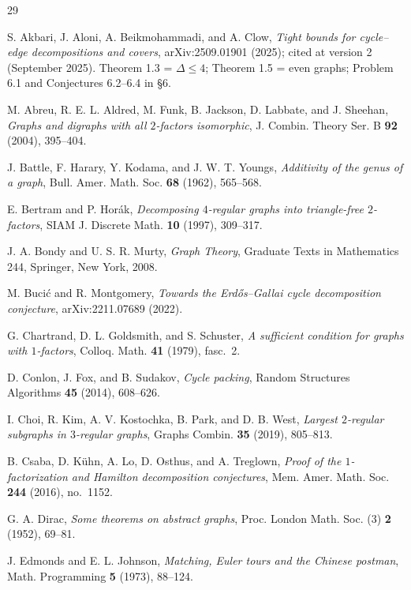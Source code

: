 \documentclass[a4paper,11pt]{amsart}
\theoremstyle{definition}
\theoremstyle{remark}
\begin{document}
\begin{thebibliography}{29}

 S. Akbari, J. Aloni, A. Beikmohammadi, and A. Clow, \emph{Tight bounds for cycle--edge
decompositions and covers}, arXiv:2509.01901 (2025); cited at version 2 (September 2025). Theorem 1.3 =
$\Delta\le4$; Theorem 1.5 = even graphs; Problem 6.1 and Conjectures 6.2--6.4 in \S6.

 M. Abreu, R. E. L. Aldred, M. Funk, B. Jackson, D. Labbate, and J. Sheehan,
\emph{Graphs and digraphs with all $2$-factors isomorphic}, J. Combin. Theory Ser. B \textbf{92} (2004),
395--404.

 J. Battle, F. Harary, Y. Kodama, and J. W. T. Youngs, \emph{Additivity of the genus of a
graph}, Bull. Amer. Math. Soc. \textbf{68} (1962), 565--568.

 E. Bertram and P. Hor\'ak, \emph{Decomposing $4$-regular graphs into triangle-free
$2$-factors}, SIAM J. Discrete Math. \textbf{10} (1997), 309--317.

 J. A. Bondy and U. S. R. Murty, \emph{Graph Theory}, Graduate Texts in Mathematics 244,
Springer, New York, 2008.

 M. Buci\'c and R. Montgomery, \emph{Towards the Erd\H{o}s--Gallai cycle decomposition
conjecture}, arXiv:2211.07689 (2022).

 G. Chartrand, D. L. Goldsmith, and S. Schuster, \emph{A sufficient condition for graphs
with $1$-factors}, Colloq. Math. \textbf{41} (1979), fasc.\ 2.

 D. Conlon, J. Fox, and B. Sudakov, \emph{Cycle packing}, Random Structures Algorithms
\textbf{45} (2014), 608--626.

 I. Choi, R. Kim, A. V. Kostochka, B. Park, and D. B. West, \emph{Largest $2$-regular
subgraphs in $3$-regular graphs}, Graphs Combin. \textbf{35} (2019), 805--813.

 B. Csaba, D. K\"uhn, A. Lo, D. Osthus, and A. Treglown, \emph{Proof of the
$1$-factorization and Hamilton decomposition conjectures}, Mem. Amer. Math. Soc. \textbf{244} (2016),
no.\ 1152.

 G. A. Dirac, \emph{Some theorems on abstract graphs}, Proc. London Math. Soc. (3)
\textbf{2} (1952), 69--81.

 J. Edmonds and E. L. Johnson, \emph{Matching, Euler tours and the Chinese postman}, Math.
Programming \textbf{5} (1973), 88--124.


\end{thebibliography}
\end{document}
